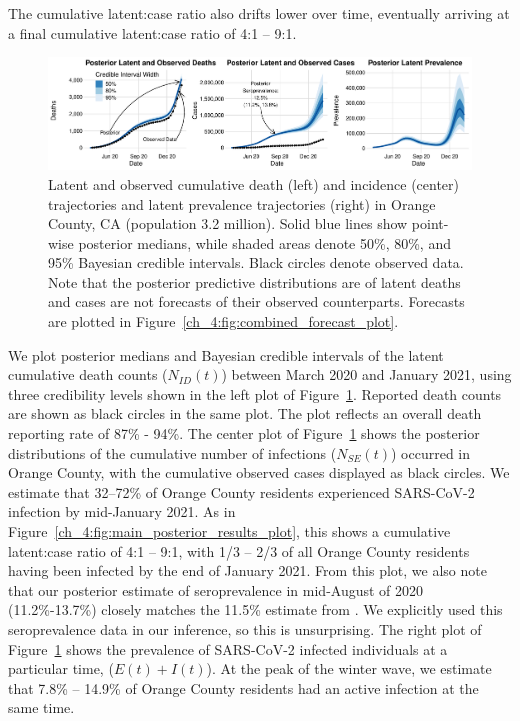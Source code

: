 The cumulative latent:case ratio also drifts lower over time, eventually arriving at a final cumulative latent:case ratio of 4:1 -- 9:1.
\par
\begin{figure}[htbp]
    \centering
    \includegraphics[width=1.0\columnwidth]{dip_plot.pdf}
    \caption[Latent and observed cumulative death and incidence trajectories and latent prevalence trajectories in Orange County, CA.]{Latent and observed cumulative death (left) and incidence (center) trajectories and latent prevalence trajectories (right) in Orange County, CA (population 3.2 million).
    Solid blue lines show point-wise posterior medians, while shaded areas denote 50\%, 80\%, and 95\% Bayesian credible intervals.
    Black circles denote observed data.
    Note that the posterior predictive distributions are of latent deaths and cases are not forecasts of their observed counterparts.
    Forecasts are plotted in Figure~\ref{ch_4:fig:combined_forecast_plot}.}
    \label{ch_4:fig:dip_plot}
\end{figure}

We plot posterior medians and Bayesian credible intervals of the latent cumulative death counts ($N_{ID}(t)$) between March 2020 and January 2021, using three credibility levels shown in the left plot of Figure~\ref{ch_4:fig:dip_plot}.
Reported death counts are shown as black circles in the same plot.
The plot reflects an overall death reporting rate of 87\% - 94\%.
The center plot of Figure~\ref{ch_4:fig:dip_plot} shows the posterior distributions of the cumulative number of infections ($N_{SE}(t)$) occurred in Orange County, with the cumulative observed cases displayed as black circles.
We estimate that 32--72\% of Orange County residents experienced SARS-CoV-2 infection by mid-January 2021.
As in Figure~\ref{ch_4:fig:main_posterior_results_plot}, this shows a cumulative latent:case ratio of 4:1 -- 9:1, with 1/3 -- 2/3 of all Orange County residents having been infected by the end of January 2021.
From this plot, we also note that our posterior estimate of seroprevalence in mid-August of 2020 (11.2\%-13.7\%) closely matches the 11.5\% estimate from \citep{Bruckner2021}. We explicitly used this seroprevalence data in our inference, so this is unsurprising.
The right plot of Figure~\ref{ch_4:fig:dip_plot} shows the prevalence of SARS-CoV-2 infected individuals at a particular time, ($E(t) + I(t)$).
At the peak of the winter wave, we estimate that 7.8\% -- 14.9\% of Orange County residents had an active infection at the same time.
\par

